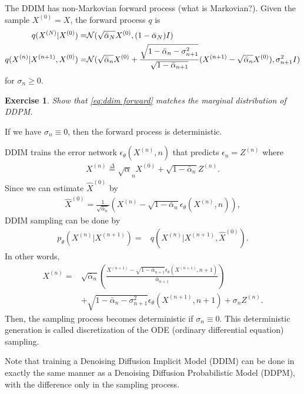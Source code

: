 \documentclass[11pt, a4paper]{article}
\newtheorem{exercise}{Exercise}
\begin{document}
The DDIM has non-Markovian forward process (what is Markovian?).
Given the sample $X^{(0)}=X$, the forward process $q$ is
\begin{align}
    q(X^{(N)}|X^{(0)}) =&  {\cal N}(\sqrt{\bar{\alpha}_N} X^{(0)}, (1-\bar{\alpha}_N)I)\\
    q(X^{(n)}|X^{(n+1)}, X^{(0)}) =& {\cal N}(\sqrt{\bar{\alpha}_n} X^{(0)} + \frac{\sqrt{1-\bar{\alpha}_n 
    - \sigma_{n+1}^2}}{\sqrt{1-\bar{\alpha}_{n+1}}} (X^{(n+1)}-\sqrt{\bar{\alpha}_n} X^{(0)}), \sigma_{n+1}^2 I)\label{eq:ddim forward}
\end{align}
for $\sigma_n\geq 0$.
\begin{exercise}
    Show that \eqref{eq:ddim forward} matches the marginal distribution of DDPM.
\end{exercise}
If we have $\sigma_n \equiv 0$, then the forward process is deterministic.

DDIM trains the error network $\epsilon_{\theta}(X^{(n)}, n)$ that predicts $\epsilon_n=Z^{(n)}$ where
\begin{align}
    X^{(n)} \stackrel{\Delta}{=} \sqrt{\alpha}_n X^{(0)} + \sqrt{1-\bar{\alpha}_n} Z^{(n)}.
\end{align}
Since we can estimate $\hat{X}^{(0)}$ by
\begin{align}
    \hat{X}^{(0)} = \frac{1}{\sqrt{\bar{\alpha}_n}} (X^{(n)} - \sqrt{1-\bar{\alpha}_n} \epsilon_{\theta}(X^{(n)}, n)),
\end{align}
DDIM sampling can be done by
\begin{align}
    p_{\theta}(X^{(n)}|X^{(n+1)}) =& q(X^{(n)}|X^{(n+1)}, \hat{X}^{(0)}).
\end{align}
In other words,
\begin{align}
    X^{(n)} =& \sqrt{\bar{\alpha}_{n}} \left(\frac{X^{(n+1)} - \sqrt{1-\bar{\alpha}_{n+1}} \epsilon_{\theta} (X^{(n+1)}, n+1)}{\bar{\alpha}_{n+1}}\right) \nonumber\\
    &+ \sqrt{1-\bar{\alpha}_n - \sigma^2_{n+1}} \epsilon_{\theta}(X^{(n+1)}, n+1) + \sigma_n Z^{(n)}.
\end{align}
Then, the sampling process becomes deterministic if $\sigma_n\equiv 0$.
This deterministic generation is called discretization of the ODE (ordinary differential equation) sampling.

Note that training a Denoising Diffusion Implicit Model (DDIM) can be done in exactly the same manner 
as a Denoising Diffusion Probabilistic Model (DDPM), with the difference only in the sampling process.
\end{document}
